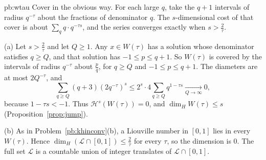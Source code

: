\begin{solution}{pb:wtau}
\idea Cover in the obvious way. For each large $q$, take the $q+1$ intervals of radius $q^{-\tau}$ about the fractions of denominator $q$. The $s$-dimensional cost of that cover is about $\sum_q q\cdot q^{-\tau s}$, and the series converges exactly when $s>\frac2\tau$.

\writeup (a) Let $s>\frac2\tau$ and let $Q\ge 1$. Any $x\in W(\tau)$ has a solution whose denominator satisfies $q\ge Q$, and that solution has $-1\le p\le q+1$. So $W(\tau)$ is covered by the intervals of radius $q^{-\tau}$ about $\frac pq$, for $q\ge Q$ and $-1\le p\le q+1$. The diameters are at most $2Q^{-\tau}$, and
\[
\sum_{q\ge Q}(q+3)(2q^{-\tau})^s\le 2^s\cdot 4\sum_{q\ge Q}q^{1-\tau s}\xrightarrow[Q\to\infty]{}0,
\]
because $1-\tau s<-1$. Thus $\mathcal H^s(W(\tau))=0$, and $\dim_HW(\tau)\le s$ (Proposition~\ref{prop:jump}).

(b) As in Problem~\ref{pb:khinconv}(b), a Liouville number in $[0,1]$ lies in every $W(\tau)$. Hence $\dim_H(\mathcal L\cap[0,1])\le\frac2\tau$ for every $\tau$, so the dimension is $0$. The full set $\mathcal L$ is a countable union of integer translates of $\mathcal L\cap[0,1]$.

\end{solution}


